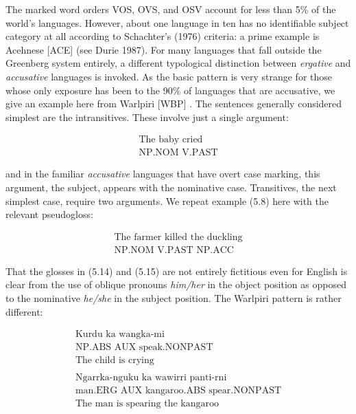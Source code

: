 The marked word orders VOS, OVS, and OSV account for less than 5\% of the
world's languages. However, about one language in ten has no identifiable
subject category at all according to Schachter's (1976) criteria: a prime
example is Acehnese [ACE] (see Durie 1987).\nocite{Durie:1987} For many languages that fall outside the Greenberg system entirely, a
different typological distinction between {\it ergative} and {\it accusative}
languages is invoked. As the basic pattern is very strange for those whose
only exposure has been to the 90\% of languages that are accusative, we give
an example here from Warlpiri [WBP] \cite{Hale:1983}. 
The sentences generally considered simplest are the intransitives. These
involve just a single argument:

\begin{eqnarray}
\mbox{The baby cried}\\
\mbox{NP.NOM  V.PAST}\nonumber
\end{eqnarray}

\noindent and in the familiar {\it accusative} languages that have overt case
marking, this argument, the subject, appears with the nominative case.
 Transitives, the next simplest case, require two arguments.
We repeat example (5.8) here with the relevant pseudogloss:

\begin{eqnarray}
\mbox{The farmer killed the duckling}\\
\mbox{NP.NOM     V.PAST    NP.ACC}\nonumber
\end{eqnarray}

\noindent
That the glosses in (5.14) and (5.15) are not entirely fictitious even for
English is clear from the use of oblique pronouns {\it him/her} in the object
position as opposed to the nominative {\it he/she} in the subject position.
The Warlpiri pattern is rather different:

\begin{eqnarray}
\mbox{Kurdu ka wangka-mi}\\
\mbox{NP.ABS AUX speak.NONPAST}\nonumber\\
\mbox{The child is crying}\nonumber\\
\nonumber\\
\mbox{Ngarrka-nguku ka wawirri panti-rni}\\
\mbox{man.ERG AUX kangaroo.ABS spear.NONPAST}\nonumber\\
\mbox{The man is spearing the kangaroo}\nonumber
\end{eqnarray}

